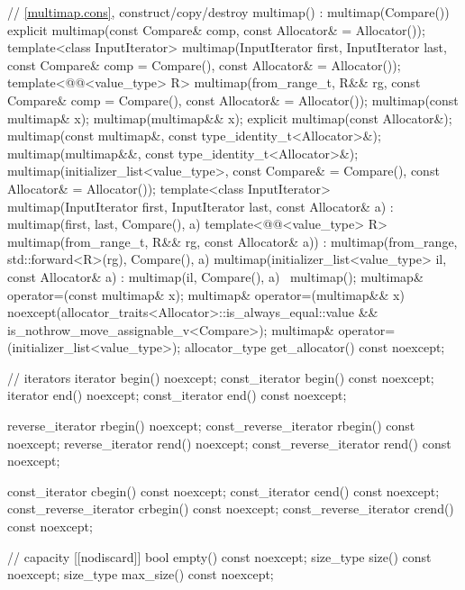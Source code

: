 \begin{codeblock}
{{    // \ref{multimap.cons}, construct/copy/destroy
    multimap() : multimap(Compare()) { }
    explicit multimap(const Compare& comp, const Allocator& = Allocator());
    template<class InputIterator>
      multimap(InputIterator first, InputIterator last,
               const Compare& comp = Compare(),
               const Allocator& = Allocator());
    template<@@<value_type> R>
      multimap(from_range_t, R&& rg,
               const Compare& comp = Compare(), const Allocator& = Allocator());
    multimap(const multimap& x);
    multimap(multimap&& x);
    explicit multimap(const Allocator&);
    multimap(const multimap&, const type_identity_t<Allocator>&);
    multimap(multimap&&, const type_identity_t<Allocator>&);
    multimap(initializer_list<value_type>,
      const Compare& = Compare(),
      const Allocator& = Allocator());
    template<class InputIterator>
      multimap(InputIterator first, InputIterator last, const Allocator& a)
        : multimap(first, last, Compare(), a) { }
    template<@@<value_type> R>
      multimap(from_range_t, R&& rg, const Allocator& a))
        : multimap(from_range, std::forward<R>(rg), Compare(), a) { }
    multimap(initializer_list<value_type> il, const Allocator& a)
      : multimap(il, Compare(), a) { }
    ~multimap();
    multimap& operator=(const multimap& x);
    multimap& operator=(multimap&& x)
      noexcept(allocator_traits<Allocator>::is_always_equal::value &&
               is_nothrow_move_assignable_v<Compare>);
    multimap& operator=(initializer_list<value_type>);
    allocator_type get_allocator() const noexcept;

    // iterators
    iterator               begin() noexcept;
    const_iterator         begin() const noexcept;
    iterator               end() noexcept;
    const_iterator         end() const noexcept;

    reverse_iterator       rbegin() noexcept;
    const_reverse_iterator rbegin() const noexcept;
    reverse_iterator       rend() noexcept;
    const_reverse_iterator rend() const noexcept;

    const_iterator         cbegin() const noexcept;
    const_iterator         cend() const noexcept;
    const_reverse_iterator crbegin() const noexcept;
    const_reverse_iterator crend() const noexcept;

    // capacity
    [[nodiscard]] bool empty() const noexcept;
    size_type size() const noexcept;
    size_type max_size() const noexcept;

}}
\end{codeblock}
